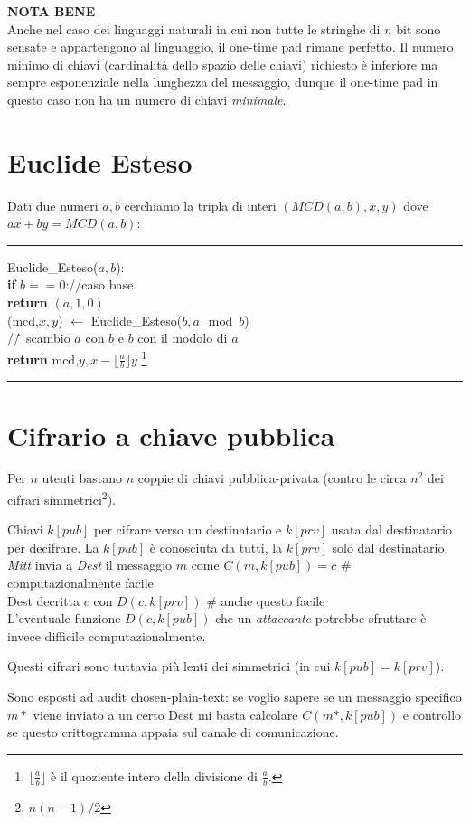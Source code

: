 \documentclass{article}
\begin{document}
 \textbf{NOTA BENE}\\
 Anche nel caso dei linguaggi naturali in cui non tutte le stringhe di $n$ bit sono sensate e appartengono al linguaggio, il one-time pad rimane perfetto. Il numero minimo di chiavi (cardinalità dello spazio delle chiavi) richiesto è inferiore ma sempre esponenziale nella lunghezza del messaggio, dunque il one-time pad in questo caso non ha un numero di chiavi \textit{minimale}.
 
 
\section{Euclide Esteso}
Dati due numeri $a,b$ cerchiamo la tripla di interi $(MCD(a,b),x,y)$ dove $ax+by=MCD(a,b)$:
\hrule
Euclide\_Esteso($a,b$):\\
\indent\indent \textbf{if} $b==0$://caso base\\
\indent\indent\indent \textbf{return} $(a,1,0)$\\
\indent\indent (mcd,$x,y$) $\leftarrow$ Euclide\_Esteso($b,a\mod b$)\\//\^\, scambio $a$ con $b$ e $b$ con il modolo di $a$\\
\indent\indent \textbf{return} mcd,$y,x-\lfloor\frac{a}{b}\rfloor y$ \footnote{$\lfloor\frac{a}{b}\rfloor$ è il quoziente intero della divisione di $\frac{a}{b}$.}
\hrule

\section{Cifrario a chiave pubblica}
Per $n$ utenti bastano $n$ coppie di chiavi pubblica-privata (contro le circa $n^2$ dei cifrari simmetrici\footnote{$n(n-1)/2$}).

Chiavi $k[pub]$ per cifrare verso un destinatario e $k[prv]$ usata dal destinatario per decifrare. La $k[pub]$ è conosciuta da tutti, la $k[prv]$ solo dal destinatario.\\
\textit{Mitt} invia a \textit{Dest} il messaggio $m$ come $C(m,k[pub])=c$ \# computazionalmente facile\\
Dest decritta $c$ con $D(c,k[prv])$ \# anche questo facile\\
L'eventuale funzione $D(c,k[pub])$ che un \textit{attaccante} potrebbe sfruttare è invece difficile computazionalmente.

Questi cifrari sono tuttavia più lenti dei simmetrici (in cui $k[pub]=k[prv]$).

Sono esposti ad audit chosen-plain-text: se voglio sapere se un messaggio specifico $m*$ viene inviato a un certo Dest mi basta calcolare $C(m*,k[pub])$ e controllo se questo crittogramma appaia sul canale di comunicazione.
\end{document}
